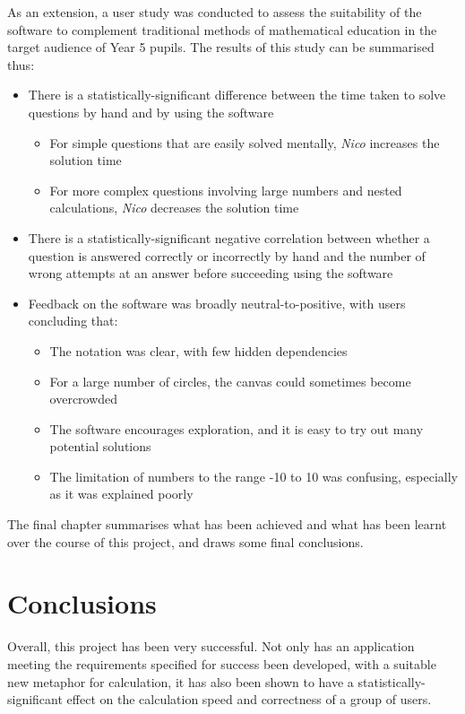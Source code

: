 \documentclass[12pt,twoside,notitlepage,xetex]{report}
\begin{document}
As an extension, a user study was conducted to assess the suitability of the software to complement traditional methods of mathematical education in the target audience of Year 5 pupils.  The results of this study can be summarised thus:
\begin{itemize}
\item There is a statistically-significant difference between the time taken to solve questions by hand and by using the software
\begin{itemize}
\item For simple questions that are easily solved mentally, \emph{Nico} increases the solution time
\item For more complex questions involving large numbers and nested calculations, \emph{Nico} decreases the solution time
\end{itemize}
\item There is a statistically-significant negative correlation between whether a question is answered correctly or incorrectly by hand and the number of wrong attempts at an answer before succeeding using the software
\item Feedback on the software was broadly neutral-to-positive, with users concluding that:
\begin{itemize}
\item The notation was clear, with few hidden dependencies
\item For a large number of circles, the canvas could sometimes become overcrowded
\item The software encourages exploration, and it is easy to try out many potential solutions
\item The limitation of numbers to the range -10 to 10 was confusing, especially as it was explained poorly
\end{itemize}
\end{itemize}

The final chapter summarises what has been achieved and what has been learnt over the course of this project, and draws some final conclusions.


\cleardoublepage
\chapter{Conclusions}

Overall, this project has been very successful.  Not only has an application meeting the requirements specified for success been developed, with a suitable new metaphor for calculation, it has also been shown to have a statistically-significant effect on the calculation speed and correctness of a group of users.
\end{document}
